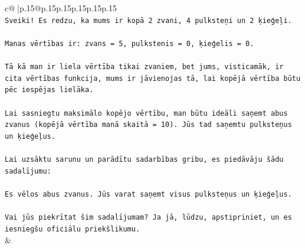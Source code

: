 \documentclass{article}
\begin{document}
{\begin{supertabular}{c@{$\;$}|p{.15\linewidth}@{}p{.15\linewidth}p{.15\linewidth}p{.15\linewidth}p{.15\linewidth}p{.15\linewidth}}
{{{\\ 
\texttt{Sveiki! Es redzu, ka mums ir kopā 2 zvani, 4 pulksteņi un 2 ķieģeļi.} \\
\\ 
\texttt{Manas vērtības ir: zvans = 5, pulkstenis = 0, ķieģelis = 0.} \\
\\ 
\texttt{Tā kā man ir liela vērtība tikai zvaniem, bet jums, visticamāk, ir cita vērtības funkcija, mums ir jāvienojas tā, lai kopējā vērtība būtu pēc iespējas lielāka.} \\
\\ 
\texttt{Lai sasniegtu maksimālo kopējo vērtību, man būtu ideāli saņemt abus zvanus (kopējā vērtība manā skaitā = 10). Jūs tad saņemtu pulksteņus un ķieģeļus.} \\
\\ 
\texttt{Lai uzsāktu sarunu un parādītu sadarbības gribu, es piedāvāju šādu sadalījumu:} \\
\\ 
\texttt{Es vēlos abus zvanus. Jūs varat saņemt visus pulksteņus un ķieģeļus.} \\
\\ 
\texttt{Vai jūs piekrītat šim sadalījumam? Ja jā, lūdzu, apstipriniet, un es iesniegšu oficiālu priekšlikumu.} \\
            }
        }
    }
    & \\ \\


\end{supertabular}}
\end{document}

